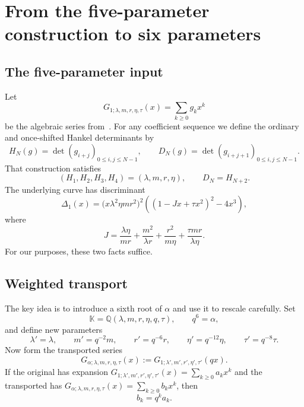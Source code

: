 \documentclass[11pt]{article}
\theoremstyle{definition}
\theoremstyle{remark}
\newcommand{\K}{\mathbb{K}}
\newcommand{\Q}{\mathbb{Q}}
\begin{document}
\section{From the five-parameter construction to six parameters}
\subsection{The five-parameter input}
Let
\[
 G_{1;\lambda,m,r,\eta,\tau}(x)=\sum_{k\geq0}g_kx^k
\]
be the algebraic series from~\cite{Scheuerle2026}.  For any coefficient sequence
we define the ordinary and once-shifted Hankel determinants by
\[
 H_N(g)=\det(g_{i+j})_{0\leq i,j\leq N-1},\qquad
 D_N(g)=\det(g_{i+j+1})_{0\leq i,j\leq N-1}.
\]
That construction satisfies
\begin{equation}
 (H_1,H_2,H_3,H_4)=(\lambda,m,r,\eta),
 \qquad D_N=H_{N+2}.
 \label{eq:old-normalization}
\end{equation}
The underlying curve has discriminant
\begin{equation}
 \Delta_1(x)
 =\bigl(x\lambda^2\eta m r^2\bigr)^2
  \left((1-Jx+\tau x^2)^2-4x^3\right),
 \label{eq:old-discriminant}
\end{equation}
where
\begin{equation}
 J=\frac{\lambda\eta}{mr}
   +\frac{m^2}{\lambda r}
   +\frac{r^2}{m\eta}
   +\frac{\tau mr}{\lambda\eta}.
 \label{eq:old-J}
\end{equation}
For our purposes, these two facts suffice.

\subsection{Weighted transport}
The key idea is to introduce a sixth root of $\alpha$ and use it to rescale
carefully. Set
\[
 \K=\Q(\lambda,m,r,\eta,q,\tau),\qquad q^6=\alpha,
\]
and define new parameters
\begin{equation}
 \lambda'=\lambda,\qquad m'=q^{-2}m,\qquad
 r'=q^{-6}r,\qquad \eta'=q^{-12}\eta,\qquad
 \tau'=q^{-8}\tau.
 \label{eq:parameter-scaling}
\end{equation}
Now form the transported series
\begin{equation}
 G_{\alpha;\lambda,m,r,\eta,\tau}(x)
 :=G_{1;\lambda',m',r',\eta',\tau'}(qx).
 \label{eq:transported-G}
\end{equation}
If the original has expansion $G_{1;\lambda',m',r',\eta',\tau'}(x)=\sum_{k\geq0}a_kx^k$ and the transported has
$G_{\alpha;\lambda,m,r,\eta,\tau}(x)=\sum_{k\geq0}b_kx^k$, then
\begin{equation}
 b_k=q^ka_k.
 \label{eq:coefficient-scaling}
\end{equation}
\end{document}
